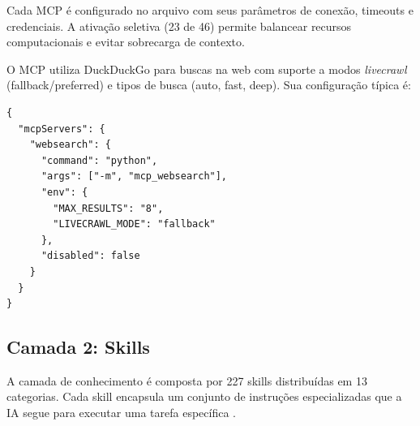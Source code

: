 \begin{table}[htb]
\centering
    \small
\caption{Categorias de MCPs no OpenCode Ecosystem}
\label{tab:mcp-categorias}
\end{table}

Cada MCP é configurado no arquivo  com seus
parâmetros de conexão, timeouts e credenciais. A ativação seletiva
(23 de 46) permite balancear recursos computacionais e evitar
sobrecarga de contexto.

\begin{exemplo}
O MCP  utiliza DuckDuckGo para buscas na web com
suporte a modos \emph{livecrawl} (fallback/preferred) e tipos de
busca (auto, fast, deep). Sua configuração típica é:
\begin{lstlisting}[style=pythonstyle]
{
  "mcpServers": {
    "websearch": {
      "command": "python",
      "args": ["-m", "mcp_websearch"],
      "env": {
        "MAX_RESULTS": "8",
        "LIVECRAWL_MODE": "fallback"
      },
      "disabled": false
    }
  }
}
\end{lstlisting}
\end{exemplo}

\subsection{Camada 2: Skills}
\label{subsec:camada-skills}

A camada de conhecimento é composta por 227 skills distribuídas em 13
categorias. Cada skill encapsula um conjunto de instruções especializadas
que a IA segue para executar uma tarefa específica
\cite{white2023prompt, wei2022chain}.

